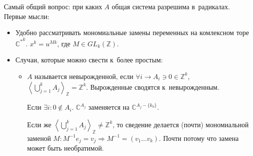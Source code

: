 \documentclass{article}
\begin{document}
Самый общий вопрос: при каких $A$ общая система разрешима в~радикалах. Первые
мысли:
\begin{itemize}
	\item Удобно рассматривать мономиальные замены переменных на комлексном торе
		${\mathbb{C}^\ast}^k$. $x^k = u^{Mk}$, где $M \in GL_k(\mathbb{Z})$.
	\item Случаи, которые можно свести к~более простым:
		\begin{itemize}
			\item $A$ называется невырожденной, если $\forall i \rightarrow A_i \ni 0
				\in \mathbb{Z}^k$, $\left< \bigcup\limits_{j=1}^k A_j \right>_\mathbb{Z}
				= \mathbb{Z}^k$. Вырожденные сводятся к~невырожденным.

				Если $\exists i: 0 \notin A_i$. $\mathbb{C}^{A_j}$ заменяется на
				$\mathbb{C}^{A_j - \{k_0\}}$.

				Если же $\left< \bigcup\limits_{j=1}^k A_j \right>_\mathbb{Z} \ne
				\mathbb{Z}^k$, то сведение делается (почти) мономиальной заменой
				$M: M^{-1} e_j = v_j \Rightarrow M^{-1} = (v_1 \ldots v_k)$. Почти
				потому что замена может быть необратимой.
		\end{itemize}
\end{itemize}
\end{document}

